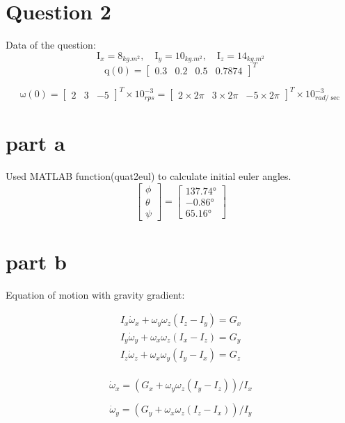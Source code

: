 \section{Question 2}
Data of the question:
$$
\mathrm{I}_x = 8_{kg.m^2},\quad \mathrm{I}_y = 10_{kg.m^2},\quad \mathrm{I}_z = 14_{kg.m^2}
$$
$$
\boldsymbol{\mathrm{q}}(0) = \begin{bmatrix}
    0.3 & 0.2 & 0.5 & 0.7874
\end{bmatrix}^T
$$

$$
\boldsymbol{\mathrm{\omega}}(0) = \begin{bmatrix}
    2 & 3 & -5
\end{bmatrix}^T \times 10^{-3}_{rps} = \begin{bmatrix}
    2\times 2\pi & 3\times 2\pi & -5\times 2\pi
\end{bmatrix}^T \times 10^{-3}_{rad/\sec}
$$

\section{part a}
Used MATLAB function(quat2eul) to calculate initial euler angles.
$$
\begin{bmatrix}
    \phi\\
    \theta\\
    \psi 
\end{bmatrix} = \begin{bmatrix}
  \ang{137.74}\\
  \ang{-0.86}\\
  \ang{65.16}
\end{bmatrix}
$$

\section{part b}
Equation of motion with gravity gradient:

\begin{align}
    I_x \dot\omega_x +  \omega_y \omega_z(I_z - I_y) = G_x\\
    I_y \dot\omega_y +  \omega_x \omega_z(I_x - I_z) = G_y\\
    I_z \dot\omega_z +  \omega_x \omega_y(I_y - I_x) = G_z\\
\end{align}

$$
\dot \omega_x = (G_x + \omega_y \omega_z(I_y - I_z))/I_x
$$

$$
\dot \omega_y = (G_y + \omega_x \omega_z(I_z - I_x))/I_y
$$

